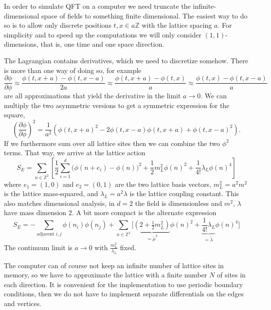 \documentclass[12pt]{article}
\begin{document}
In order to simulate QFT on a computer we need truncate the
infinite-dimensional space of fields to something finite
dimensional. The easiest way to do so is to allow only discrete
positions $t, x \in a \mathbb{Z}$ with the lattice spacing $a$. For
simplicity and to speed up the computations we will only consider
$(1,1)$-dimensions, that is, one time and one space direction.

The Lagrangian contains derivatives, which we need to discretize
somehow. There is more than one way of doing so, for example
\begin{equation}
  \frac{\partial \phi}{\partial \phi}
  \approx 
  \frac{\phi(t,x+a) - \phi(t,x-a)}{2a}
  \approx
  \frac{\phi(t,x+a) - \phi(t,x)}{a}
  \approx
  \frac{\phi(t,x) - \phi(t,x-a)}{a}
\end{equation}
are all approximations that yield the derivative in the limit $a\to
0$. We can multiply the two asymmetric versions to get a symmetric
expression for the square,
\begin{equation}
  \left(\frac{\partial \phi}{\partial \phi}\right)^2
  =
  \frac{1}{a^2} \left(
    \phi(t, x+a)^2 - 2 \phi(t,x-a) \phi(t,x+a) + \phi(t, x-a)^2
  \right).
\end{equation}
If we furthermore sum over all lattice sites then we can combine the
two $\phi^2$ terms. That way, we arrive at the lattice action
\begin{equation}
  S_E = \sum_{n\in \mathbb{Z}^2} \left[
    \frac{1}{2} \sum_{i=1}^d 
    \big(\phi(n+e_i) - \phi(n)\big)^2 
    + \frac{1}{2} m_L^2 \phi(n)^2 + \frac{1}{4!} \lambda_L \phi(n)^4
  \right]
\end{equation}
where $e_1=(1,0)$ and $e_2=(0,1)$ are the two lattice basis vectors,
$m_L^2=a^2 m^2$ is the lattice mass-squared, and
$\lambda_L=a^2\lambda$ is the lattice coupling constant. This also
matches dimensional analysis, in $d=2$ the field is dimensionless and
$m^2$, $\lambda$ have mass dimension $2$. A bit more compact is the
alternate expression
\begin{equation}
  S_E = -\sum_{\text{adjacent }i,j} \phi(n_i) \phi(n_j)
  + \sum_{n\in\mathbb{Z}^2}\Big[
    \underbrace{\left(2+\tfrac{1}{2}m_L^2\right)}_{=\tilde\mu^2} \phi(n)^2 
    + \underbrace{\frac{1}{4!} \lambda_L}_{=\tilde\lambda} \phi(n)^4
  \Big]
\end{equation}
The continuum limit is $a\to 0$ with $\frac{m_L^2}{\lambda_L}$ fixed.

The computer can of course not keep an infinite number of lattice
sites in memory, so we have to approximate the lattice with a finite
number $N$ of sites in each direction. It is convenient for the
implementation to use periodic boundary conditions, then we do not
have to implement separate differentials on the edges and vertices.
\end{document}
